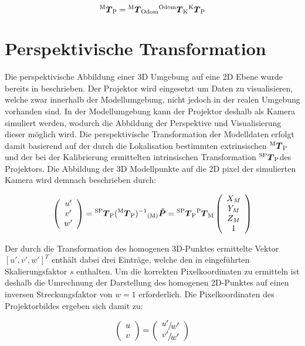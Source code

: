 \begin{equation}
{^{\mathrm{M}}\mbox{\boldmath{$T$}}_{\mathrm{P}}} = {^{\mathrm{M}}\mbox{\boldmath{$T$}}_{\mathrm{Odom}}}{^{\mathrm{Odom}}\mbox{\boldmath{$T$}}_{\mathrm{K}}}{^{\mathrm{K}}\mbox{\boldmath{$T$}}_{\mathrm{P}}}
\end{equation}

\section{Perspektivische Transformation}
Die perspektivische Abbildung einer 3D Umgebung auf eine 2D Ebene wurde bereits in  beschrieben. Der Projektor wird eingesetzt um Daten zu visualisieren, welche zwar innerhalb der Modellumgebung, nicht jedoch in der realen Umgebung vorhanden sind. In der Modellumgebung kann der Projektor deshalb als Kamera simuliert werden, wodurch die Abbildung der Perspektive und Visualisierung dieser möglich wird. Die perspektivische Transformation der Modelldaten erfolgt damit basierend auf der durch die Lokalisation bestimmten extrinsischen ${^{\mathrm{M}}\mbox{\boldmath{$T$}}_{\mathrm{P}}}$ und der bei der Kalibrierung ermittelten intrinsischen Transformation ${^{\mathrm{SP}}\mbox{\boldmath{$T$}}_{\mathrm{P}}}$ des Projektors. Die Abbildung der 3D Modellpunkte auf die 2D pixel der simulierten Kamera wird demnach beschrieben durch:

\begin{equation}
\left(\begin{array}{c}
u'\\
v'\\
w'
\end{array}\right)
= {^{\mathrm{SP}}\mbox{\boldmath{$T$}}_{\mathrm{P}}}({^{\mathrm{M}}\mbox{\boldmath{$T$}}_{\mathrm{P}}})^{-1}{_{{\mathrm{(M)}}}}\mbox{\boldmath{$\tilde{P}$}} = {^{\mathrm{SP}}\mbox{\boldmath{$T$}}_{\mathrm{P}}}{^{\mathrm{P}}\mbox{\boldmath{$T$}}_{\mathrm{M}}} \left(\begin{array}{c}
X_M\\
Y_M\\
Z_M\\
1
\end{array} \right)
\label{eq.proj_trans}
\end{equation}

Der durch die Transformation des homogenen 3D-Punktes ermittelte Vektor $[u',v',w']^T$ enthält dabei drei Einträge, welche den in  eingeführten Skalierungsfaktor $s$ enthalten. Um die korrekten Pixelkoordinaten zu ermitteln ist deshalb die Umrechnung der Darstellung des homogenen 2D-Punktes auf einen inversen Streckungsfaktor von $w=1$ erforderlich. Die Pixelkoordinaten des Projektorbildes ergeben sich damit zu:

\begin{equation}
\left(\begin{array}{c}
u\\
v
\end{array}\right)
=
\left(\begin{array}{c}
\nicefrac{u'}{w'}\\
\nicefrac{v'}{w'}
\end{array}\right)
\end{equation}

